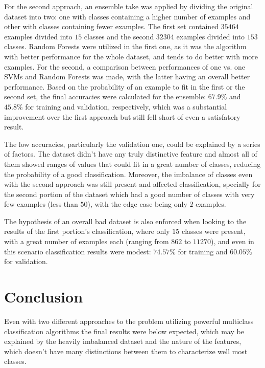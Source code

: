 \documentclass[10pt,twocolumn,letterpaper]{article}
\begin{document}
For the second approach, an ensemble take was applied by dividing the original dataset into two: one with classes containing a higher number of examples and other with classes containing fewer examples. The first set contained $35464$ examples divided into $15$ classes and the second $32304$ examples divided into $153$ classes. Random Forests were utilized in the first one, as it was the algorithm with better performance for the whole dataset, and tends to do better with more examples. For the second, a comparison between performances of one vs. one SVMs and Random Forests was made, with the latter having an overall better performance. Based on the probability of an example to fit in the first or the second set, the final accuracies were calculated for the ensemble: $67.9\%$ and $45.8\%$ for training and validation, respectively, which was a substantial improvement over the first approach but still fell short of even a satisfatory result.

The low accuracies, particularly the validation one, could be explained by a series of factors. The dataset didn't have any truly distinctive feature and almost all of them showed ranges of values that could fit in a great number of classes, reducing the probability of a good classification. Moreover, the imbalance of classes even with the second approach was still present and affected classification, specially for the second portion of the dataset which had a good number of classes with very few examples (less than $50$), with the edge case being only $2$ examples.

The hypothesis of an overall bad dataset is also enforced when looking to the results of the first portion's classification, where only $15$ classes were present, with a great number of examples each (ranging from $862$ to $11270$), and even in this scenario classification results were modest: $74.57\%$ for training and $60.05\%$ for validation.
 
\section{Conclusion}
Even with two different approaches to the problem utilizing powerful multiclass classification algorithms the final results were below expected, which may be explained by the heavily imbalanced dataset and the nature of the features, which doesn't have many distinctions between them to characterize well most classes.


\end{document}
